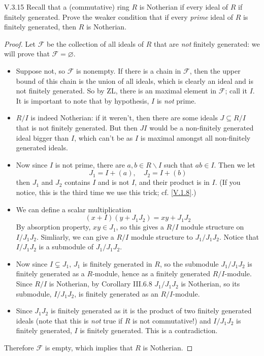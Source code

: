 \begin{problem}{V.3.15}
Recall that a (commutative) ring $R$ is Notherian if every ideal of $R$ if finitely generated. Prove the weaker condition that if every \emph{prime} ideal of $R$ is finitely generated, then $R$ is Notherian.
\end{problem}
\begin{proof}
Let $\mathscr{F}$ be the collection of all ideals of $R$ that are \emph{not} finitely generated: we will prove that $\mathscr{F} = \varnothing$.
\begin{itemize}
	\setlength\itemsep{0pt}
	\item Suppose not, so $\mathscr{F}$ is nonempty. If there is a chain in $\mathscr{F}$, then the upper bound of this chain is the union of all ideals, which is clearly an ideal and is not finitely generated. So by ZL, there is an maximal element in $\mathscr{F}$; call it $I$. It is important to note that by hypothesis, $I$ is \emph{not} prime.
	\item $R/I$ is indeed Notherian: if it weren't, then there are some ideals $J \subseteq R/I$ that is not finitely generated. But then $JI$ would be a non-finitely generated ideal bigger than $I$, which can't be as $I$ is maximal amongst all non-finitely generated ideals.
	\item Now since $I$ is not prime, there are $a,b \in R\backslash I$ such that $ab \in I$. Then we let 
	\[
	J_1 = I + (a), \quad J_2 = I + (b)	
	\]
	then $J_1$ and $J_2$ contains $I$ and is not $I$, and their product is in $I$. (If you notice, this is the third time we use this trick; cf. \ref{V.1.8}.)
	\item We can define a scalar multiplication
	\[
	(x + I)(y + J_1J_2) = xy + J_1J_2	
	\]
	By absorption property, $xy \in J_1$, so this gives a $R/I$ module structure on $I/J_1J_2$. Simliarly, we can give a $R/I$ module structure to $J_1/J_1J_2$. Notice that $I/J_1J_2$ is a submodule of $J_1/J_1J_2$.
	\item Now since $I \subsetneq J_1$, $J_1$ is finitely generated in $R$, so the submodule $J_1/J_1J_2$ is finitely generated as a $R$-module, hence as a finitely generated $R/I$-module. Since $R/I$ is Notherian, by Corollary III.6.8 $J_1/J_1J_2$ is Notherian, so its submodule, $I/J_1J_2$, is finitely generated as an $R/I$-module.
	\item Since $J_1J_2$ is finitely generated as it is the product of two finitely generated ideals (note that this is \emph{not} true if $R$ is not commutative!) and $I/J_1J_2$ is finitely generated, $I$ is finitely generated. This is a contradiction. 
\end{itemize}
Therefore $\mathscr{F}$ is empty, which implies that $R$ is Notherian.
\end{proof}